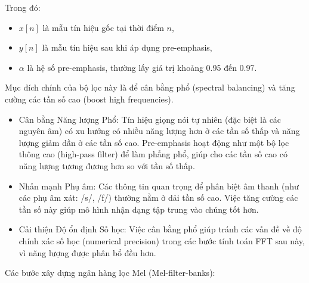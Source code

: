 Trong đó:
\begin{itemize}
    \item $x[n]$ là mẫu tín hiệu gốc tại thời điểm $n$,
    \item $y[n]$ là mẫu tín hiệu sau khi áp dụng pre-emphasis,
    \item $\alpha$ là hệ số pre-emphasis, thường lấy giá trị khoảng 0.95 đến 0.97.
\end{itemize}
Mục đích chính của bộ lọc này là để cân bằng phổ (spectral balancing) và tăng cường các tần số cao (boost high frequencies).
\begin{itemize}
    \item Cân bằng Năng lượng Phổ: Tín hiệu giọng nói tự nhiên (đặc biệt là các nguyên âm) có xu hướng có nhiều năng lượng hơn ở các tần số thấp và năng lượng giảm dần ở các tần số cao. Pre-emphasis hoạt động như một bộ lọc thông cao (high-pass filter) để làm phẳng phổ, giúp cho các tần số cao có năng lượng tương đương hơn so với tần số thấp.
    \item Nhấn mạnh Phụ âm: Các thông tin quan trọng để phân biệt âm thanh (như các phụ âm xát: /s/, /f/) thường nằm ở dải tần số cao. Việc tăng cường các tần số này giúp mô hình nhận dạng tập trung vào chúng tốt hơn.
    \item Cải thiện Độ ổn định Số học: Việc cân bằng phổ giúp tránh các vấn đề về độ chính xác số học (numerical precision) trong các bước tính toán FFT sau này, vì năng lượng được phân bổ đều hơn.
\end{itemize}
\noindent
Các bước xây dựng ngân hàng lọc Mel (Mel-filter-banks):
